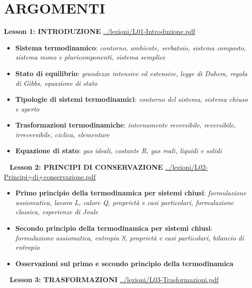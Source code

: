 \section{ARGOMENTI}
\textbf{Lesson 1: INTRODUZIONE}\newline
\url{../lezioni/L01-Introduzione.pdf}
\begin{itemize}
    \item \textbf{Sistema termodinamico}: \textit{contorno, ambiente, serbatoio, sistema composto, sistema mono e pluricomponenti, sistema semplice}
    \item \textbf{Stato di equilibrio}: \textit{grandezze intensive ed estensive, legge di Duhem, regola di Gibbs, equazione di stato}
    \item \textbf{Tipologie di sistemi termodinamici}: \textit{contorno del sistema, sistema chiuso e aperto}
    \item \textbf{Trasformazioni termodinamiche}: \textit{internamente reversibile, reversibile, irreversibile, ciclica, elementare}
    \item \textbf{Equazione di stato}: \textit{gas ideali, costante R, gas reali, liquidi e solidi}
\end{itemize}
\ \newline
\newline
\textbf{Lesson 2: PRINCIPI DI CONSERVAZIONE}\newline
\url{../lezioni/L02-Principi+di+conservazione.pdf}
\begin{itemize}
    \item \textbf{Primo principio della termodinamica per sistemi chiusi}: \textit{formulazione assiomatica, lavoro L, calore Q, proprietà e casi particolari, formulazione classica, esperienze di Joule}
    \item \textbf{Secondo principio della termodinamica per sistemi chiusi}: \textit{formulazione assiomatica, entropia S, proprietà e casi particolari, bilancio di entropia}
    \item \textbf{Osservazioni sul primo e secondo principio della termodinamica}
\end{itemize}
\ \newline
\newline
\textbf{Lesson 3: TRASFORMAZIONI}\newline
\url{../lezioni/L03-Trasformazioni.pdf}
